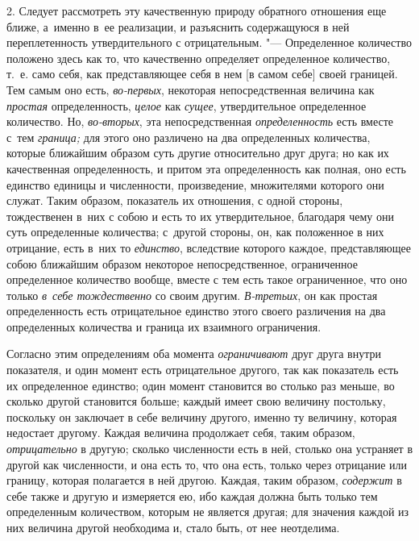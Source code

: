 2. Следует рассмотреть эту качественную природу обратного отношения еще ближе,
а~именно в~ее реализации, и разъяснить содержащуюся в ней переплетенность
утвердительного с отрицательным. "--- Определенное количество положено здесь
как то, что качественно определяет определенное количество, т.~е. само себя,
как представляющее себя в нем [в самом себе] своей границей. Тем самым оно
есть, {\em во-первых}, некоторая непосредственная величина как {\em простая}
определенность, {\em целое} как {\em сущее}, утвердительное определенное
количество. Но, {\em во-вторых}, эта непосредственная {\em определенность} есть
вместе с~тем {\em граница;} для этого оно различено на два определенных
количества, которые ближайшим образом суть другие относительно друг друга; но
как их качественная определенность, и притом эта определенность как полная, оно
есть единство единицы и численности, произведение, множителями которого они
служат. Таким образом, показатель их отношения, с одной стороны, тождественен
в~них с собою и есть то их утвердительное, благодаря чему они суть определенные
количества; с~другой стороны, он, как положенное в них отрицание, есть в~них то
{\em единство}, вследствие которого каждое, представляющее собою ближайшим
образом некоторое непосредственное, ограниченное определенное количество
вообще, вместе с тем есть такое ограниченное, что оно только
{\em в~себе тождественно} со своим другим. {\em В-третьих}, он как простая
определенность есть отрицательное единство этого своего различения на два
определенных количества и граница их взаимного ограничения.

Согласно этим определениям оба момента {\em ограничивают} друг друга внутри
показателя, и один момент есть отрицательное другого, так как показатель есть
их определенное единство; один момент становится во столько раз меньше, во
сколько другой становится больше; каждый имеет свою величину постольку,
поскольку он заключает в себе величину другого, именно ту величину, которая
недостает другому. Каждая величина продолжает себя, таким образом,
{\em отрицательно} в другую; сколько численности есть в ней, столько она
устраняет в другой как численности, и она есть то, что она есть, только через
отрицание или границу, которая полагается в ней другою. Каждая, таким образом,
{\em содержит} в себе также и другую и измеряется ею, ибо каждая должна быть
только тем определенным количеством, которым не является другая; для значения
каждой из них величина другой необходима и, стало быть, от нее неотделима.

